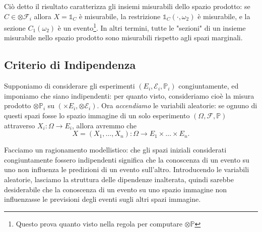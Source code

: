Ciò detto il risultato caratterizza gli insiemi misurabili dello spazio prodotto: se $C \in \otimes \mathcal{F}_i$ allora $X = \mathbb{1}_C$ è misurabile, la restrizione $\mathbb{1}_C(\boldsymbol{\cdot},\omega_2)$ è misurabile, e la sezione $C_1(\omega_2)$ è un evento\footnote{Questo prova quanto visto nella regola per computare $\otimes \mathbb{P}$}. 
In altri termini, tutte le "sezioni" di un insieme misurabile nello spazio prodotto sono misurabili rispetto agli spazi marginali.

\subsection{Criterio di Indipendenza}

Supponiamo di considerare gli esperimenti $(E_i, \mathcal{E}_i, \mathbb{P}_i)$ congiuntamente, ed imponiamo che siano indipendenti: per quanto visto, consideriamo cioè la misura prodotto $\otimes \mathbb{P}_i$ su $(\times E_i, \otimes \mathcal{E}_i)$.
Ora \textit{accendiamo} le variabili aleatorie: se ognuno di questi spazi fosse lo spazio immagine di un solo esperimento $(\Omega,\mathcal{F},\mathbb{P})$ attraverso $X_i : \Omega \to E_i$, allora avremmo che
\[
	X=(X_1,\dots,X_n) : \Omega \to E_1 \times \dots \times E_n.
\]

Facciamo un ragionamento modellistico: che gli spazi iniziali considerati congiuntamente fossero indipendenti significa che la conoscenza di un evento su uno non influenza le predizioni di un evento sull'altro. 
Introducendo le variabili aleatorie, lasciamo la struttura delle dipendenze inalterata, quindi sarebbe desiderabile che la conoscenza di un evento su uno spazio immagine non influenzasse le previsioni degli eventi sugli altri spazi immagine. 

